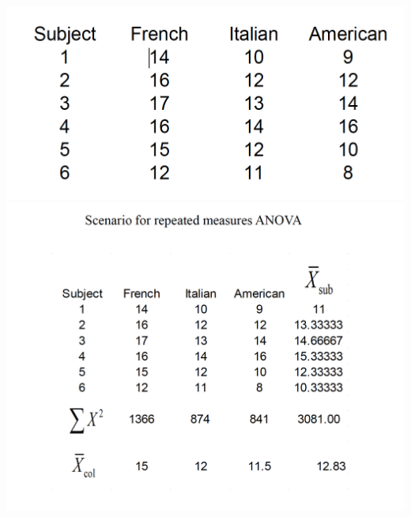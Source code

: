 \documentclass[]{book}
\theoremstyle{definition}
\theoremstyle{definition}
\theoremstyle{definition}
\theoremstyle{remark}
\begin{document}
\includegraphics{img/hicksrma5.png} \includegraphics{img/hicksrma6.png}
\end{document}
